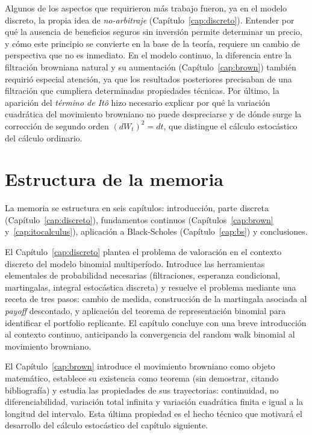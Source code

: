 \documentclass[11pt,a4paper,oneside]{report}
\theoremstyle{plain}
\theoremstyle{definition}
\theoremstyle{remark}
\newcommand{\1}{\mathbf{1}}
\begin{document}
Algunos de los aspectos que requirieron más trabajo fueron, ya en el modelo discreto, la propia idea de \emph{no-arbitraje} (Capítulo~\ref{cap:discreto}). Entender por qué la ausencia de beneficios seguros sin inversión permite determinar un precio, y cómo este principio se convierte en la base de la teoría, requiere un cambio de perspectiva que no es inmediato. En el modelo continuo, la diferencia entre la filtración browniana natural y su aumentación (Capítulo~\ref{cap:brown}) también requirió especial atención, ya que los resultados posteriores precisaban de una filtración que cumpliera determinadas propiedades técnicas. Por último, la aparición del \emph{término
de Itô} hizo necesario explicar por qué la variación cuadrática del movimiento browniano no puede despreciarse y de dónde surge la corrección de segundo orden $(dW_t)^2 = dt$, que distingue el cálculo estocástico del cálculo ordinario.

\section{Estructura de la memoria}
\label{sec:estructura}

La memoria se estructura en seis capítulos: introducción, parte
discreta (Capítulo~\ref{cap:discreto}), fundamentos continuos
(Capítulos~\ref{cap:brown} y~\ref{cap:itocalculus}), aplicación a
Black-Scholes (Capítulo~\ref{cap:bs}) y conclusiones.

El Capítulo~\ref{cap:discreto} plantea el problema de valoración en el contexto discreto del modelo
binomial multiperíodo. Introduce las herramientas elementales de
probabilidad necesarias (filtraciones, esperanza condicional,
martingalas, integral estocástica discreta) y resuelve el problema
mediante una receta de tres pasos: cambio de medida, construcción de
la martingala asociada al \emph{payoff} descontado, y aplicación del
teorema de representación binomial para identificar el portfolio
replicante. El capítulo concluye con una breve introducción al contexto continuo, anticipando la convergencia del random walk binomial al
movimiento browniano.

El Capítulo~\ref{cap:brown} introduce el movimiento browniano como objeto matemático, establece su
existencia como teorema (sin demostrar, citando bibliografía) y
estudia las propiedades de sus trayectorias: continuidad, no
diferenciabilidad, variación total infinita y variación cuadrática
finita e igual a la longitud del intervalo. Esta última propiedad es
el hecho técnico que motivará el desarrollo del cálculo estocástico
del capítulo siguiente.
\end{document}

